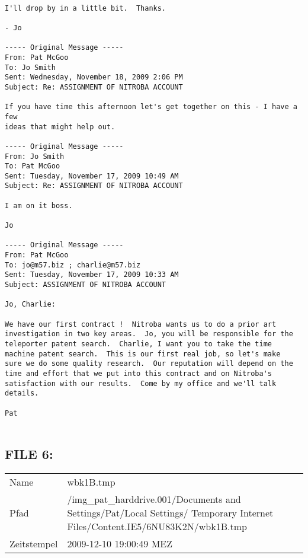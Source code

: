 \begin{lstlisting}

I'll drop by in a little bit.  Thanks.

- Jo

----- Original Message -----
From: Pat McGoo
To: Jo Smith
Sent: Wednesday, November 18, 2009 2:06 PM
Subject: Re: ASSIGNMENT OF NITROBA ACCOUNT

If you have time this afternoon let's get together on this - I have a few
ideas that might help out.

----- Original Message -----
From: Jo Smith
To: Pat McGoo
Sent: Tuesday, November 17, 2009 10:49 AM
Subject: Re: ASSIGNMENT OF NITROBA ACCOUNT

I am on it boss.

Jo

----- Original Message -----
From: Pat McGoo
To: jo@m57.biz ; charlie@m57.biz
Sent: Tuesday, November 17, 2009 10:33 AM
Subject: ASSIGNMENT OF NITROBA ACCOUNT

Jo, Charlie:

We have our first contract !  Nitroba wants us to do a prior art
investigation in two key areas.  Jo, you will be responsible for the
teleporter patent search.  Charlie, I want you to take the time
machine patent search.  This is our first real job, so let's make
sure we do some quality research.  Our reputation will depend on the
time and effort that we put into this contract and on Nitroba's
satisfaction with our results.  Come by my office and we'll talk
details.

Pat


\end{lstlisting}

\subsection{FILE 6:}
\label{sec:pat_emails_6}	

\begin{table}[htb]
	\begin{tabular}{p{2cm} p{13.5cm}}
		Name & wbk1B.tmp\\
		Pfad & /img_pat_harddrive.001/Documents and Settings/Pat/Local Settings/ Temporary Internet Files/Content.IE5/6NU83K2N/wbk1B.tmp\\
		Zeitstempel & 2009-12-10 19:00:49 MEZ
	\end{tabular}
\end{table}	


